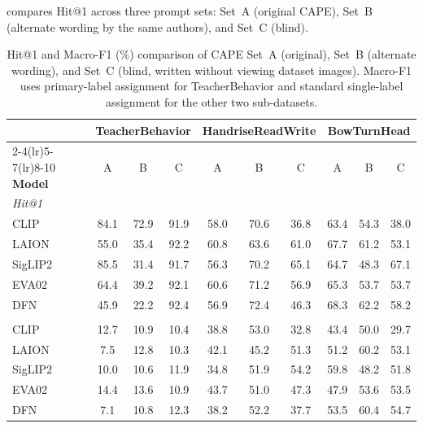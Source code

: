 \documentclass[electronics,article,submit,pdftex,moreauthors]{Definitions/mdpi}
\begin{document}
 compares Hit@1 across three prompt sets: Set~A (original CAPE), Set~B (alternate wording by the same authors), and Set~C (blind).

\begin{table}[H]
\caption{Hit@1 and Macro-F1 (\%) comparison of CAPE Set~A (original), Set~B (alternate wording), and Set~C (blind, written without viewing dataset images). Macro-F1 uses primary-label assignment for TeacherBehavior and standard single-label assignment for the other two sub-datasets.}
\label{tab:blind_prompts}
\centering
\small
\setlength{\tabcolsep}{2.5pt}
\begin{tabular}{l cc@{~~}c cc@{~~}c cc@{~~}c}
\toprule
 & \multicolumn{3}{c}{\textbf{TeacherBehavior}} & \multicolumn{3}{c}{\textbf{HandriseReadWrite}} & \multicolumn{3}{c}{\textbf{BowTurnHead}} \\
\cmidrule(lr){2-4}\cmidrule(lr){5-7}\cmidrule(lr){8-10}
\textbf{Model} & A & B & C & A & B & C & A & B & C \\
\midrule
\multicolumn{10}{l}{\textit{Hit@1}} \\
CLIP & 84.1 & 72.9 & 91.9 & 58.0 & 70.6 & 36.8 & 63.4 & 54.3 & 38.0 \\
LAION & 55.0 & 35.4 & 92.2 & 60.8 & 63.6 & 61.0 & 67.7 & 61.2 & 53.1 \\
SigLIP2 & 85.5 & 31.4 & 91.7 & 56.3 & 70.2 & 65.1 & 64.7 & 48.3 & 67.1 \\
EVA02 & 64.4 & 39.2 & 92.1 & 60.6 & 71.2 & 56.9 & 65.3 & 53.7 & 53.7 \\
DFN & 45.9 & 22.2 & 92.4 & 56.9 & 72.4 & 46.3 & 68.3 & 62.2 & 58.2 \\
\addlinespace
\multicolumn{10}{l}{\textit{Macro-F1 (primary-label for TeacherBehavior; single-label accuracy-based for Handrise and BowTurn)}} \\
CLIP & 12.7 & 10.9 & 10.4 & 38.8 & 53.0 & 32.8 & 43.4 & 50.0 & 29.7 \\
LAION & 7.5 & 12.8 & 10.3 & 42.1 & 45.2 & 51.3 & 51.2 & 60.2 & 53.1 \\
SigLIP2 & 10.0 & 10.6 & 11.9 & 34.8 & 51.9 & 54.2 & 59.8 & 48.2 & 51.8 \\
EVA02 & 14.4 & 13.6 & 10.9 & 43.7 & 51.0 & 47.3 & 47.9 & 53.6 & 53.5 \\
DFN & 7.1 & 10.8 & 12.3 & 38.2 & 52.2 & 37.7 & 53.5 & 60.4 & 54.7 \\
\bottomrule
\end{tabular}
\end{table}
\end{document}
